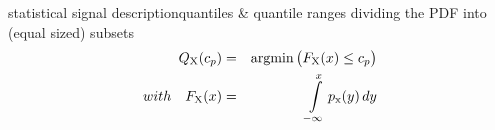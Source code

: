 		\begin{frame}{statistical signal description}{quantiles \& quantile ranges}
			dividing the PDF into (equal sized) subsets
			\begin{eqnarray*}
				Q_\mathrm{X}(c_p) &=& \operatorname*{argmin}\big (F_\mathrm{X}(x) \leq c_p\big)\\
                with\quad F_\mathrm{X}(x) &=& {\int\limits_{-\infty}^{x}{p_\mathrm{x}(y)\, dy}}
			\end{eqnarray*}
        \end{frame}
		
